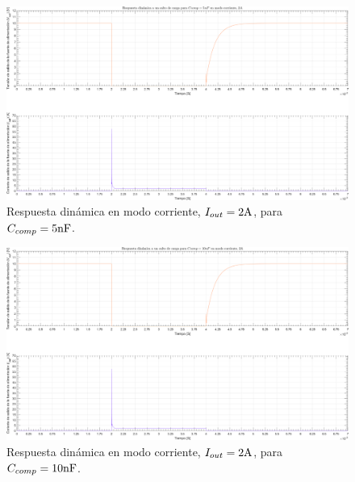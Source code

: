 \clearpage

\begin{figure}[H] %
\begin{center}
\includegraphics[width=1.1 \textwidth, angle=90]{./img/plots/dynamic/power_supply_CCOMP_5n_STEP_Modo3.png}
\caption{\label{fig:fig_power_supply_CCOMP_STEP_5n_Modo3}\footnotesize{Respuesta dinámica en modo corriente, $I_{out} = 2 \si[per-mode=symbol]{\ampere}$, para $C_{comp} = 5 \si[per-mode=symbol]{\nano\farad} $.}}
\end{center}
\end{figure}

\clearpage

\begin{figure}[H] %
\begin{center}
\includegraphics[width=1.1 \textwidth, angle=90]{./img/plots/dynamic/power_supply_CCOMP_10n_STEP_Modo3.png}
\caption{\label{fig:fig_power_supply_CCOMP_STEP_10n_Modo3}\footnotesize{Respuesta dinámica en modo corriente, $I_{out} = 2 \si[per-mode=symbol]{\ampere}$, para $C_{comp} = 10 \si[per-mode=symbol]{\nano\farad} $.}}
\end{center}
\end{figure}

